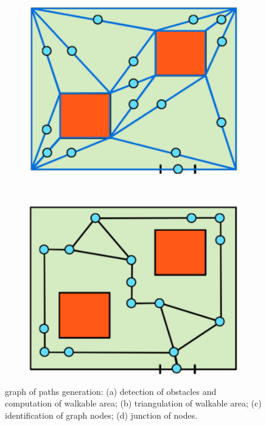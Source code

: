 \documentclass[]{egpubl}
\begin{document}
\begin{figure}[h]
\begin{subfigure}[b]{0.22\linewidth}
 \caption{}
 \end{subfigure}
~
 \begin{subfigure}[b]{0.22\linewidth}
 \includegraphics[width=\textwidth]{images/graph-new-3}
 \caption{}
 \end{subfigure}
~
 \begin{subfigure}[b]{0.22\linewidth}
 \includegraphics[width=\textwidth]{images/graph-new-4}
 \caption{}
 \end{subfigure}
 
 \caption{graph of paths generation: 
 (a) detection of obstacles and computation of walkable area; 
 (b) triangulation of walkable area; 
 (c) identification of graph nodes; 
 (d) junction of nodes.
 }
 \label{fig:graph-generation}
\end{figure}
\end{document}
